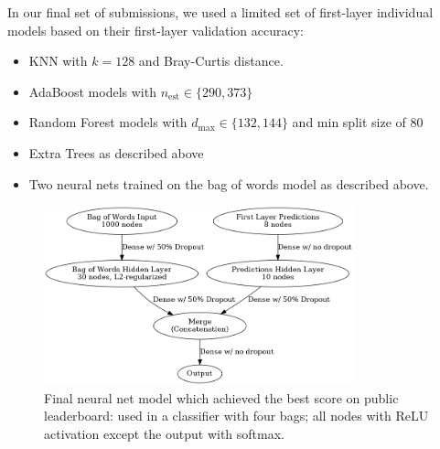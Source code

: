 \begin{itemize}
In our final set of submissions, we used a limited set of first-layer individual models based on their first-layer validation accuracy:
\begin{itemize}
\item KNN with $k=128$ and Bray-Curtis distance.
\item AdaBoost models with $n_\textrm{est} \in \{290,373\}$
\item Random Forest models with $d_\textrm{max} \in \{132,144\}$ and min split size of 80
\item Extra Trees as described above
\item Two neural nets trained on the bag of words model as described above.
\end{itemize}

\begin{figure}[h!]
\centering
\includegraphics[width=0.8\textwidth]{final_nn.png}
\caption{Final neural net model which achieved the best score on public leaderboard: used in a classifier with four bags; all nodes with ReLU activation except the output with softmax.}
\end{figure}


\end{itemize}

